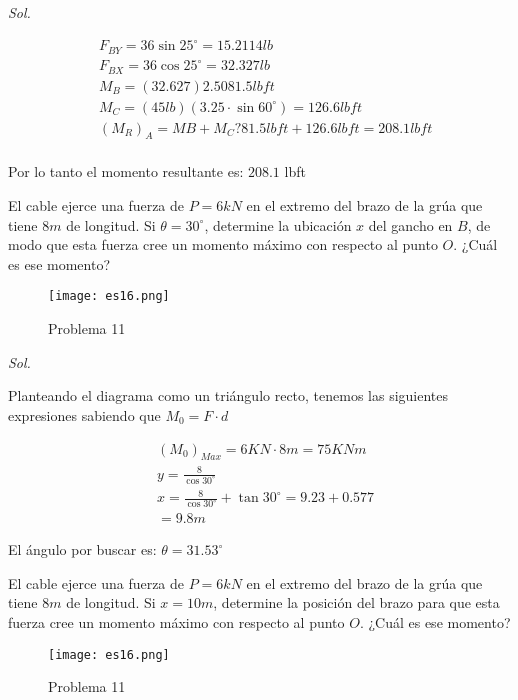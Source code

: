 \textit{ Sol.}

\begin{align*}
	 & F_{BY}=36\sin{25^{\circ}}=15.2114 lb             \\
	 & F_{BX}=36\cos{25^{\circ}}=32.327 lb              \\
	 & M_B=(32.627)2.5081.5 lbft                        \\
	 & M_C=(45lb)(3.25\cdot \sin{60^{\circ}})=126.6lbft \\
	 & (M_R)_A=MB+M_C?81.5lbft+126.6lbft=208.1 lbft     \\
\end{align*}

Por lo tanto el momento resultante es: $208.1$ lbft


\begin{problem}
El cable ejerce una fuerza de $P=6 kN$ en el extremo del brazo de la grúa que tiene $8 m$ de longitud. Si $\theta=30^{\circ}$, determine la ubicación $x$ del gancho en $B$, de modo que esta fuerza cree un momento máximo con respecto al punto $O$. ¿Cuál es ese momento?
\end{problem}

\begin{figure}[h!]
	\centering
	\texttt{[image: es16.png]}
	\caption{Problema 11}
\end{figure}

\textit{ Sol.}

Planteando el diagrama como un triángulo recto, tenemos las siguientes expresiones sabiendo que $M_0=F\cdot d$

\begin{align*}
	 & (M_0)_{Max}=6KN\cdot 8m=75KNm                            \\
	 & y=\frac{8}{\cos{30^{\circ}}}                             \\
	 & x=\frac{8}{\cos{30^{\circ}}}+\tan{30^{\circ}}=9.23+0.577 \\
	 & =9.8m
\end{align*}

El ángulo por buscar es: $\theta=31.53^{\circ}$


\begin{problem}
El cable ejerce una fuerza de $P=6 kN$ en el extremo del brazo de la grúa que tiene $8 m$ de longitud. Si $x=10 m$, determine la posición del brazo para que esta fuerza cree un momento máximo con respecto al punto $O$. ¿Cuál es ese momento?
\end{problem}

\begin{figure}[h!]
	\centering
	\texttt{[image: es16.png]}
	\caption{Problema 11}
\end{figure}

